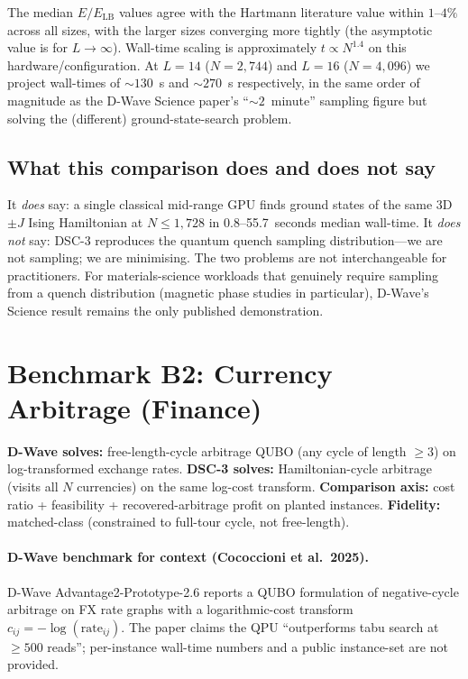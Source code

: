 \documentclass[11pt,a4paper]{article}
\begin{document}
The median $E/E_{\mathrm{LB}}$ values agree with the Hartmann literature
value within $1$--$4\%$ across all sizes, with the larger sizes converging
more tightly (the asymptotic value is for $L\!\to\!\infty$).
Wall-time scaling is approximately
$t \propto N^{1.4}$ on this hardware/configuration.
At $L=14$ ($N=2{,}744$) and $L=16$ ($N=4{,}096$) we project wall-times of
$\sim 130$~s and $\sim 270$~s respectively, in the same order of magnitude
as the D-Wave Science paper's ``$\sim 2$~minute'' sampling figure but
solving the (different) ground-state-search problem.

\subsection{What this comparison does and does not say}

It \emph{does} say: a single classical mid-range GPU finds ground states of
the same 3D $\pm J$ Ising Hamiltonian at $N\!\le\!1{,}728$ in
0.8--55.7~seconds median wall-time. It \emph{does not} say:
DSC-3 reproduces the quantum quench sampling distribution---we are not
sampling; we are minimising. The two problems are not interchangeable for
practitioners. For materials-science workloads that genuinely require
sampling from a quench distribution (magnetic phase studies in particular),
D-Wave's Science result remains the only published demonstration.

\section{Benchmark B2: Currency Arbitrage (Finance)}
\label{sec:b2}

\textbf{D-Wave solves:} free-length-cycle arbitrage QUBO (any cycle of
length $\ge 3$) on log-transformed exchange rates.
\textbf{DSC-3 solves:} Hamiltonian-cycle arbitrage (visits all $N$
currencies) on the same log-cost transform.
\textbf{Comparison axis:} cost ratio + feasibility +
recovered-arbitrage profit on planted instances.
\textbf{Fidelity:} matched-class (constrained to full-tour cycle, not
free-length).

\paragraph{D-Wave benchmark for context (Cococcioni et al.~2025).}
D-Wave Advantage2-Prototype-2.6 reports a QUBO formulation of
negative-cycle arbitrage on FX rate graphs with a logarithmic-cost
transform $c_{ij} = -\log(\text{rate}_{ij})$. The paper claims the
QPU ``outperforms tabu search at $\ge\!500$ reads''; per-instance
wall-time numbers and a public instance-set are not provided.
\end{document}
